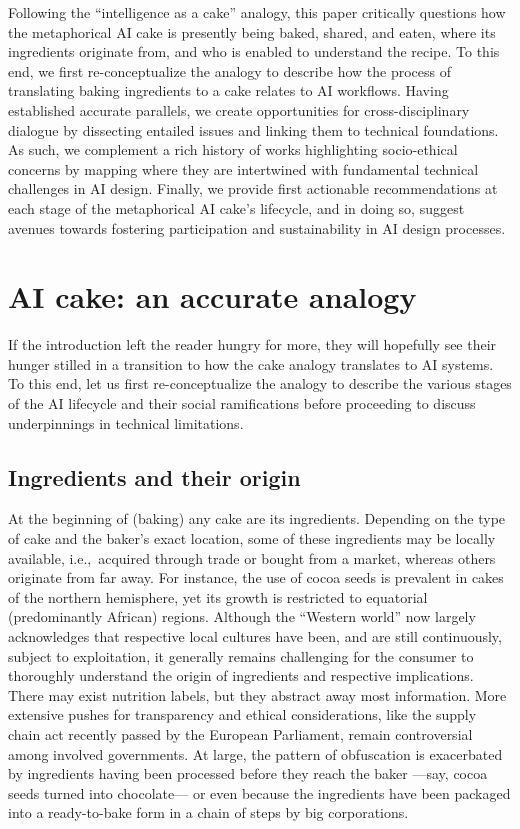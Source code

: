 \documentclass[manuscript,screen,authorversion,nonacm]{acmart}
\begin{document}
Following the ``intelligence as a cake'' analogy, this paper critically questions how the metaphorical AI cake is presently being baked, shared, and eaten, where its ingredients originate from, and who is enabled to understand the recipe. To this end, we first re-conceptualize the analogy to describe how the process of translating baking ingredients to a cake relates to AI workflows. Having established accurate parallels, we create opportunities for cross-disciplinary dialogue by dissecting entailed issues and linking them to technical foundations. As such, we complement a rich history of works highlighting socio-ethical concerns by mapping where they are intertwined with fundamental technical challenges in AI design. Finally, we provide first actionable recommendations at each stage of the metaphorical AI cake's lifecycle, and in doing so, suggest avenues towards fostering participation and sustainability in AI design processes. 

\section{AI cake: an accurate analogy}
If the introduction left the reader hungry for more, they will hopefully see their hunger stilled in a transition to how the cake analogy translates to AI systems. To this end, let us first re-conceptualize the analogy to describe the various stages of the AI lifecycle and their social ramifications before proceeding to discuss underpinnings in technical limitations.

\subsection{Ingredients and their origin}
At the beginning of (baking) any cake are its ingredients. Depending on the type of cake and the baker's exact location, some of these ingredients may be locally available, i.e.,~acquired through trade or bought from a market, whereas others originate from far away. For instance, the use of cocoa seeds is prevalent in cakes of the northern hemisphere, yet its growth is restricted to equatorial (predominantly African) regions. Although the ``Western world'' now largely acknowledges that respective local cultures have been, and are still continuously, subject to exploitation, it generally remains challenging for the consumer to thoroughly understand the origin of ingredients and respective implications. There may exist nutrition labels, but they abstract away most information. More extensive pushes for transparency and ethical considerations, like the supply chain act \cite{SupplyChainAct2024} recently passed by the European Parliament, remain controversial among involved governments. 
At large, the pattern of obfuscation is exacerbated by ingredients having been processed before they reach the baker ---say, cocoa seeds turned into chocolate--- or even because the ingredients have been packaged into a ready-to-bake form in a chain of steps by big corporations. 
\end{document}
